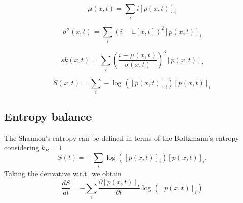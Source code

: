 \documentclass[conference]{IEEEtran}
\begin{document}
\begin{equation}
\mu(x,t) = \sum_i i [p(x,t)]_i
\end{equation}

\begin{equation}
\sigma^2(x,t) = \sum_i (i - \mathbb{E}[x,t])^2 [p(x,t)]_i
\end{equation}

\begin{equation}
sk(x,t) = \sum_i \left(\frac{i - \mu(x,t)}{\sigma(x,t)}\right)^3 [p(x,t)]_i
\end{equation}

\begin{equation}
S(x,t) = \sum_i -\log([p(x,t)]_i) [p(x,t)]_i
\end{equation}

\subsection{Entropy balance}
The Shannon's entropy can be defined in terms of the Boltzmann's entropy considering $k_B = 1$
%
\begin{equation}
S(t) = - \sum_i \log([p(x,t)]_i)[p(x,t)]_i.
\end{equation}
%
Taking the derivative w.r.t. we obtain
%
\begin{equation}
\frac{dS}{dt} = - \sum_i \frac{\partial [p(x,t)]_i}{\partial t} \log([p(x,t)]_i)
\end{equation}
\end{document}
